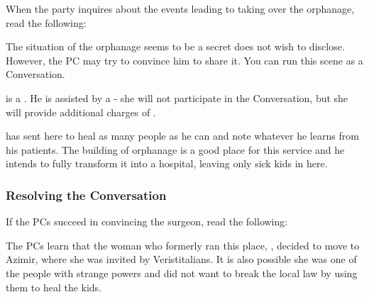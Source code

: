 When the party inquires about the events leading to \locationKharbranth{} taking over the orphanage, read the following:


The situation of the orphanage seems to be a secret \npcDoctor{} does not wish to disclose. However, the PC may try to convince him to share it. You can run this scene as a Conversation.

\npcDoctor{} is a \enemyDiagramSurgeonB{}.  He is assisted by a \enemyDiagramScribe{} - she will not participate in the Conversation, but she will provide additional charges of \abilityFutureKnowledgeName[4].

\locationKharbranth{} has sent \npcDoctor{} here to heal as many people as he can and note whatever he learns from his patients. The building of orphanage is a good place for this service and he intends to fully transform it into a hospital, leaving only sick kids in here.


\subsubsection{Resolving the Conversation}

If the PCs succeed in convincing the surgeon, read the following:


The PCs learn that the woman who formerly ran this place, \npcArshqqam{}, decided to move to Azimir, where she was invited by Veristitalians. It is also possible she was one of the people with strange powers and did not want to break the local law by using them to heal the kids.

